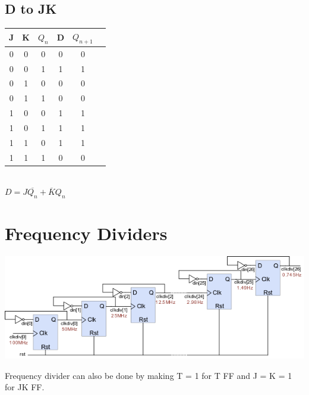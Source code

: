 \documentclass[11pt]{article}
\begin{document}
\begin{multicols}{2}
\subsection*{D to JK}
    \begin{minipage}{\linewidth}
        \begin{center}
            \begin{tabular}{ |c|c|c|c|c|c| } 
                \hline
                J & K & $Q_n$ & D & $Q_{n+1}$ \\
                \hline
                0 & 0 & 0 & 0 & 0\\
                \hline
                0 & 0 & 1 & 1 & 1\\
                \hline
                0 & 1 & 0 & 0 & 0\\
                \hline
                0 & 1 & 1 & 0 & 0\\
                \hline
                1 & 0 & 0 & 1 & 1\\
                \hline
                1 & 0 & 1 & 1 & 1\\
                \hline
                1 & 1 & 0 & 1 & 1\\
                \hline
                1 & 1 & 1 & 0 & 0\\
                \hline
            \end{tabular}\\
            \vspace{10pt}
            $D=J\overline{Q_n}+\overline{K}Q_n$
        \end{center}
    \end{minipage}
\end{multicols}

\section*{Frequency Dividers}
\begin{center}
    \includegraphics[scale=0.7]{clk1.png}
\end{center}
Frequency divider can also be done by making T = 1 for T FF and J = K = 1 for JK FF.
\end{document}
